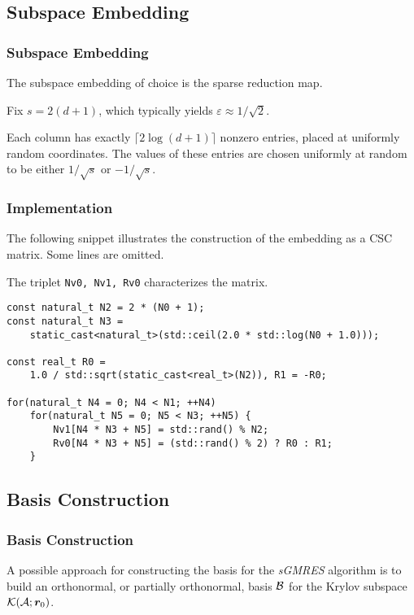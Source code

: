 \subsection{Subspace Embedding}

\begin{frame}
    \frametitle{Subspace Embedding}

    The subspace embedding of choice is the sparse reduction map. 
    
    Fix $s = 2 \left( d + 1 \right)$, which typically yields $\varepsilon \approx 1 / \sqrt{2}$.
    
    Each column has exactly $\lceil 2 \log \left( d + 1 \right) \rceil$ nonzero entries, placed at uniformly random coordinates. The values of these entries are chosen uniformly at random to be either $1 / \sqrt{s}$ or $-1 / \sqrt{s}$.
\end{frame}

\begin{frame}[fragile]
    \frametitle{Implementation}

    The following snippet illustrates the construction of the embedding as a CSC matrix. Some lines are omitted.

    The triplet \lstinline{Nv0, Nv1, Rv0} characterizes the matrix.

\begin{lstlisting}[style=cpp]
const natural_t N2 = 2 * (N0 + 1);
const natural_t N3 = 
    static_cast<natural_t>(std::ceil(2.0 * std::log(N0 + 1.0)));

const real_t R0 =
    1.0 / std::sqrt(static_cast<real_t>(N2)), R1 = -R0;

for(natural_t N4 = 0; N4 < N1; ++N4)
    for(natural_t N5 = 0; N5 < N3; ++N5) {
        Nv1[N4 * N3 + N5] = std::rand() % N2;
        Rv0[N4 * N3 + N5] = (std::rand() % 2) ? R0 : R1;
    }
\end{lstlisting}

\end{frame}

\subsection{Basis Construction}

\begin{frame}
    \frametitle{Basis Construction}

    A possible approach for constructing the basis for the \textit{sGMRES} algorithm is to build an orthonormal, or partially orthonormal, basis $\mathcal{B}$ for the Krylov subspace $\mathcal{K}(\mathcal{A}; \bm{r}_0)$.

\end{frame}

